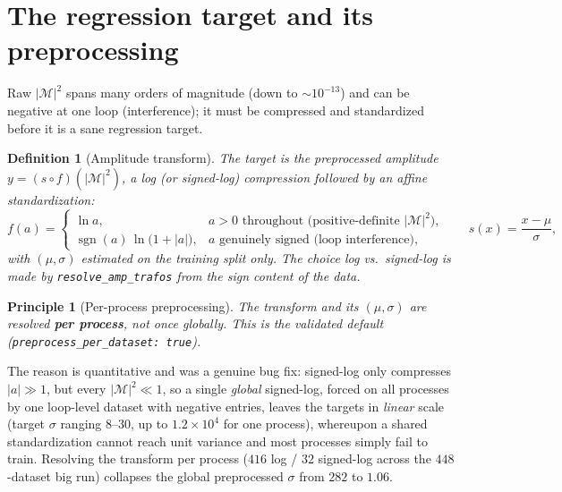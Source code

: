 \documentclass[11pt]{article}
\newcommand{\abs}[1]{\left\lvert #1 \right\rvert}
\newcommand{\Mamp}{\mathcal{M}}
\newcommand{\amp}{\abs{\Mamp}^2}
\newcommand{\code}[1]{\texttt{#1}}
\newtheorem{definition}{Definition}
\newtheorem{principle}{Principle}
\begin{document}
\section{The regression target and its preprocessing}\label{sec:target}

Raw $\amp$ spans many orders of magnitude (down to $\sim\!10^{-13}$) and can be
negative at one loop (interference); it must be compressed and standardized before it
is a sane regression target.

\begin{definition}[Amplitude transform]\label{def:trafo}
The target is the preprocessed amplitude $y = (s\circ f)(\amp)$, a \emph{log} (or
\emph{signed-log}) compression followed by an affine \emph{standardization}:
\begin{equation}
  f(a) =
  \begin{cases}
    \ln a, & \text{$a>0$ throughout (positive-definite $\amp$),}\\[2pt]
    \operatorname{sgn}(a)\,\ln\!\bigl(1+\abs a\bigr), & \text{$a$ genuinely signed (loop interference),}
  \end{cases}
  \qquad
  s(x) = \frac{x-\mu}{\sigma},
  \label{eq:trafo}
\end{equation}
with $(\mu,\sigma)$ estimated on the training split only. The choice log vs.\ signed-log
is made by \code{resolve\_amp\_trafos} from the sign content of the data.
\end{definition}

\begin{principle}[Per-process preprocessing]\label{prin:perproc}
The transform and its $(\mu,\sigma)$ are resolved \textbf{per process}, not once
globally. This is the validated default (\code{preprocess\_per\_dataset: true}).
\end{principle}

\noindent The reason is quantitative and was a genuine bug fix:
signed-log only compresses $\abs a\!\gg\!1$, but every $\amp\!\ll\!1$, so a single
\emph{global} signed-log, forced on all processes by one loop-level dataset with
negative entries, leaves the targets in \emph{linear} scale (target $\sigma$ ranging
$8$--$30$, up to $1.2\times10^{4}$ for one process), whereupon a shared standardization
cannot reach unit variance and most processes simply fail to train. Resolving the
transform per process ($416$ log / $32$ signed-log across the $448$-dataset big run)
collapses the global preprocessed $\sigma$ from $282$ to $1.06$.
\end{document}
